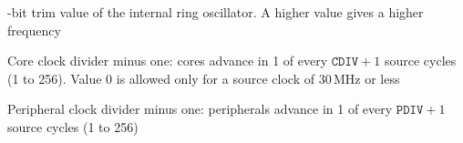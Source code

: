 \par\vspace{5pt}\noindent\begin{minipage}{\linewidth}
\vspace{2pt}
{\small{}-bit trim value of the internal ring oscillator. A higher value gives a higher frequency\par}
\end{minipage}\par

\par\vspace{5pt}\noindent\begin{minipage}{\linewidth}
\vspace{2pt}
{\small\noindent Core clock divider minus one: cores advance in 1 of every $\mathtt{CDIV}+1$ source cycles (1 to 256). Value 0 is allowed only for a source clock of 30\,MHz or less\par}
\end{minipage}\par

\par\vspace{5pt}\noindent\begin{minipage}{\linewidth}
\vspace{2pt}
{\small\noindent Peripheral clock divider minus one: peripherals advance in 1 of every $\mathtt{PDIV}+1$ source cycles (1 to 256)\par}
\end{minipage}\par

